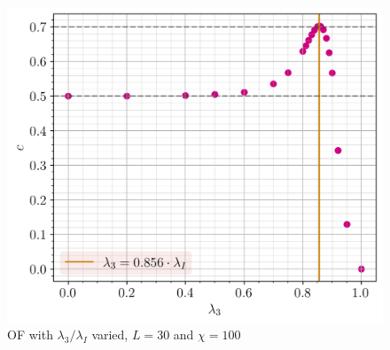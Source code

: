 \documentclass[10pt]{beamer}
\begin{document}
\begin{frame}
\begin{columns}
        \pause
        \begin{column}{0.5\linewidth}
            \vspace{0.5cm}
            \begin{figure}
                \hspace{-0.8cm}
                \includegraphics[scale=0.43]{../../graphs/through/pbc/L=30.0_chi=100.0_J=1.0_h=1.0_i=1.0_c=0.0.png}
                \caption{OF with $\lambda_3/\lambda_I$ varied, $L=30$ and $\chi=100$}
            \end{figure}
        \end{column}        
    \end{columns}
\end{frame}
\end{document}
